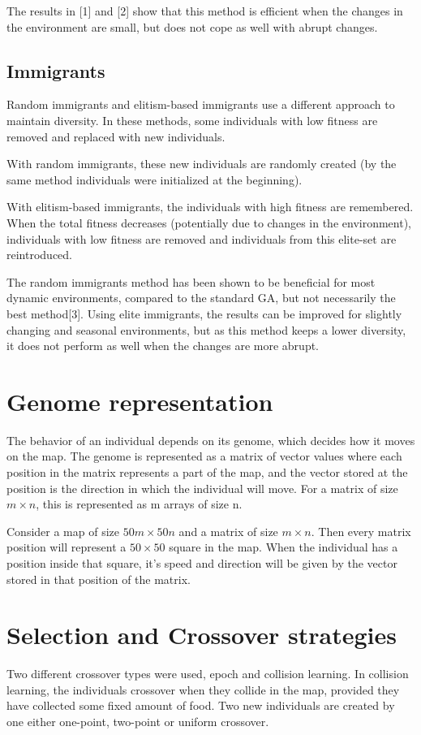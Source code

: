 \documentclass[a4paper,12pt]{article}
\begin{document}
The results in [1] and [2] show that this method is efficient when the changes in the environment are small, but does not cope as well with abrupt changes.
\subsection{Immigrants}
Random immigrants and elitism-based immigrants use a different approach to maintain diversity. In these methods, some individuals with low fitness are removed and replaced with new individuals.

With random immigrants, these new individuals are randomly created (by the same method individuals were initialized at the beginning).

With elitism-based immigrants, the individuals with high fitness are remembered. When the total fitness decreases (potentially due to changes in the environment), individuals with low fitness are removed and individuals from this elite-set are reintroduced.

The random immigrants method has been shown to be beneficial for most dynamic environments, compared to the standard GA, but not necessarily the best method[3]. Using elite immigrants, the results can be improved for slightly changing and seasonal environments, but as this method keeps a lower diversity, it does not perform as well when the changes are more abrupt.

\section{Genome representation}
The behavior of an individual depends on its genome, which decides how it moves on the map. The genome is represented as a matrix of vector values where each position in the matrix represents a part of the map, and the vector stored at the position is the direction in which the individual will move. For a matrix of size $m \times n$, this is represented as m arrays of size n.

Consider a map of size $50m \times 50n$ and a matrix of size $m \times n$. Then every matrix position will represent a $50\times50$ square in the map. When the individual has a position inside that square, it's speed and direction will be given by the vector stored in that position of the matrix.

\section{Selection and Crossover strategies}
Two different crossover types were used, epoch and collision learning. In collision learning, the individuals crossover when they collide in the map, provided they have collected some fixed amount of food. Two new individuals are created by one either one-point, two-point or uniform crossover.
\end{document}
